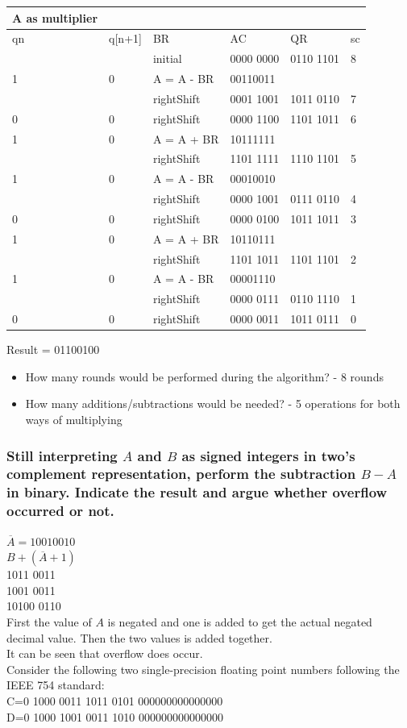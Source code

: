 \documentclass[12pt, a4paper]{article}
\begin{document}
\begin{table}[h!]
\begin{tabular}{|l|l|l|l|l|l|}
A as multiplier\\
\hline
qn & q[n+1] & BR & AC & QR & sc\\
\hline
& & initial & 0000 0000  & 0110 1101  & 8\\
\hline
1 & 0 & A = A - BR &00110011 & & \\
\hline
& &  rightShift & 0001 1001  & 1011 0110  & 7\\
\hline
0 & 0 &  rightShift & 0000 1100  & 1101 1011  & 6\\
\hline
1 & 0 & A = A + BR & 10111111 & & \\
\hline
& &  rightShift & 1101 1111  & 1110 1101  & 5\\
\hline
1 & 0 & A = A - BR &00010010 & & \\
\hline
& &  rightShift & 0000 1001  & 0111 0110  & 4\\
\hline
0 & 0 &  rightShift & 0000 0100  & 1011 1011  & 3\\
\hline
1 & 0 & A = A + BR & 10110111 & & \\
\hline
& &  rightShift & 1101 1011  & 1101 1101  & 2\\
\hline
1 & 0 & A = A - BR &00001110 & & \\
\hline
& &  rightShift & 0000 0111  & 0110 1110  & 1\\
\hline
0 & 0 &  rightShift & 0000 0011  & 1011 0111  & 0\\
\hline
\end{tabular}
\end{table}
Result = 01100100
				\begin{itemize}
					\item How many rounds would be performed during the algorithm?  - 8 rounds
					\item How many additions/subtractions would be needed? - 5 operations for both ways of multiplying
				\end{itemize}
			\subsubsection{Still interpreting $A$ and $B$ as signed integers in two’s complement representation, perform the subtraction $B-A$ in binary. Indicate the result and argue whether overflow occurred or not.}
				$\overline{A}=1001 0010$\\
				$B+(\overline{A}+1)$\\
				 1011 0011\\
				 1001 0011\\
				10100 0110\\
				First the value of $A$ is negated and one is added to get the actual negated decimal value. Then the two values is added together.\\
				It can be seen that overflow does occur.\\[4mm]
			Consider the following two single-precision floating point numbers following the IEEE 754 standard:\\
			C=0 1000 0011 1011 0101 000000000000000\\
			D=0 1000 1001 0011 1010 000000000000000
\end{document}
